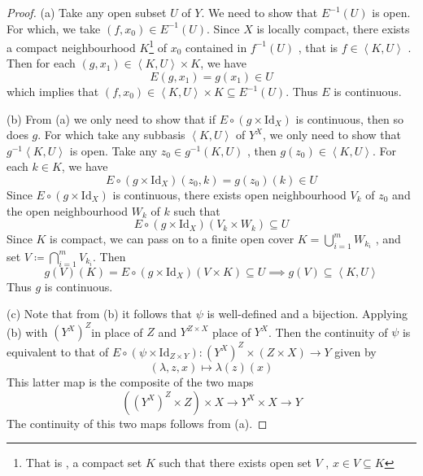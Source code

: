 \documentclass[../main.tex]{subfiles}
\begin{document}
\begin{proof}
    (a) Take any open subset \(  U  \) of \(  Y  \). We need to show that \(  E^{-1} \left( U \right)   \) is open. For which, we take \(  \left( f, x_0 \right)\in E^{-1} \left( U \right)   \). Since \(  X  \) is locally compact, there exists a compact neighbourhood \(  K  \)\footnote{That is , a compact set \(  K  \) such that there exists open set \(  V  \) , \(  x\in V\subseteq K  \)   } of \(  x_0  \) contained in \(  f^{-1} \left( U \right)   \) , that is \(  f\in \left<K,U \right>  \) .   Then for each \( \left( g,x_1 \right) \in \left<K,U \right>\times K   \), we have \[
    E\left(  g,x_1\right)= g\left( x_1 \right)\in U  
    \] which implies that  \(  \left( f,x_0 \right)\in \left<K,U \right>\times K\subseteq E^{-1} \left( U \right)     \). Thus \(  E  \) is continuous.   
    
    (b) From (a) we only need to show that if \(  E\circ \left( g\times \mathrm{Id}_{X} \right)   \) is continuous, then so does \(  g  \). For which take any subbasis \(  \left<K,U \right>   \) of \(  Y^{X}  \), we only need to show that \(  g^{-1} \left<K,U \right>  \) is open. Take any \(  z_0 \in g^{-1} \left( K,U \right)   \) ,      then \(  g\left( z_0 \right) \in \left<K,U \right>   \). For each \(  k \in K  \), we have \[
    E\circ \left( g \times \mathrm{Id}_{X} \right)\left(z_0,k\right)  = g\left( z_0 \right)\left( k \right)\in U  
    \]  Since \(  E\circ \left( g\times \mathrm{Id}_{X} \right)   \)  is continuous, there exists open neighbourhood \(  V_{k}  \) of \(  z_0  \)   and the open neighbourhood \(  W_{k}  \) of \(  k  \) such that  \[
    E\circ \left( g\times \mathrm{Id}_{X} \right)\left( V_{k}\times W_{k} \right)\subseteq U  
    \]  Since \(  K  \) is compact, we can pass on to a finite open cover \(  K= \bigcup _{i= 1}^{m}W_{k_{i}} \) , and set \(  V\coloneqq \bigcap _{i= 1}^{m}V_{k_{i}}  \). Then \[
    g\left( V \right)\left( K \right)= E\circ \left( g\times \mathrm{Id}_{X} \right)\left( V\times K \right)\subseteq U\implies g\left( V \right)\subseteq \left<K,U \right>     
    \]   Thus \(  g  \) is continuous. 

    (c) Note that from (b) it follows that \(  \psi   \) is  well-defined and a bijection. Applying (b) with \(  \left( Y^{X} \right)^{Z}   \)in place of \(  Z  \)  and  \(  Y^{Z\times X}  \) place of \(  Y^{X}  \). Then the continuity of  \(  \psi   \) is equivalent to that of \(  E\circ \left( \psi \times \mathrm{Id}_{Z\times Y} \right):\left( Y^{X} \right)^{Z}\times \left( Z\times X \right) \to Y    \)     given by \[
    \left(  \lambda ,z,x \right)\mapsto  \lambda \left( z \right)\left( x \right)      \] This latter map is the composite of the two maps \[
    \left( \left( Y^{X} \right)^{Z}\times Z  \right)\times X\to Y^{X}\times X\to Y 
    \]The continuity of this two maps follows from (a).


\end{proof}
\end{document}
